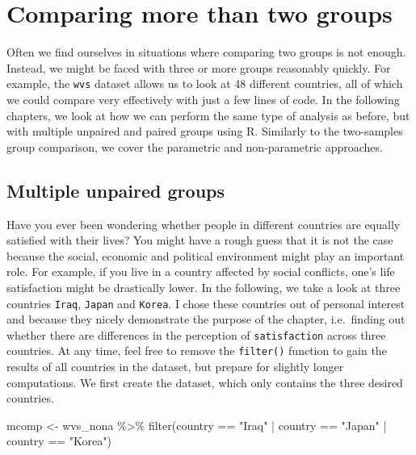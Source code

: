 \documentclass[
]{book}
\newenvironment{Shaded}{\begin{snugshade}}{\end{snugshade}}
\newcommand{\FunctionTok}[1]{\textcolor[rgb]{0.00,0.00,0.00}{#1}}
\newcommand{\NormalTok}[1]{#1}
\newcommand{\OtherTok}[1]{\textcolor[rgb]{0.56,0.35,0.01}{#1}}
\newcommand{\SpecialCharTok}[1]{\textcolor[rgb]{0.00,0.00,0.00}{#1}}
\newcommand{\StringTok}[1]{\textcolor[rgb]{0.31,0.60,0.02}{#1}}
\begin{document}
\hypertarget{comparing-more-than-two-groups}{%
\section{Comparing more than two groups}\label{comparing-more-than-two-groups}}

Often we find ourselves in situations where comparing two groups is not enough. Instead, we might be faced with three or more groups reasonably quickly. For example, the \texttt{wvs} dataset allows us to look at 48 different countries, all of which we could compare very effectively with just a few lines of code. In the following chapters, we look at how we can perform the same type of analysis as before, but with multiple unpaired and paired groups using R. Similarly to the two-samples group comparison, we cover the parametric and non-parametric approaches.

\hypertarget{multiple-unpaired-groups}{%
\subsection{Multiple unpaired groups}\label{multiple-unpaired-groups}}

Have you ever been wondering whether people in different countries are equally satisfied with their lives? You might have a rough guess that it is not the case because the social, economic and political environment might play an important role. For example, if you live in a country affected by social conflicts, one's life satisfaction might be drastically lower. In the following, we take a look at three countries \texttt{Iraq}, \texttt{Japan} and \texttt{Korea}. I chose these countries out of personal interest and because they nicely demonstrate the purpose of the chapter, i.e.~finding out whether there are differences in the perception of \texttt{satisfaction} across three countries. At any time, feel free to remove the \texttt{filter()} function to gain the results of all countries in the dataset, but prepare for slightly longer computations. We first create the dataset, which only contains the three desired countries.

\begin{Shaded}
\begin{Highlighting}[]
\NormalTok{mcomp }\OtherTok{\textless{}{-}}\NormalTok{ wvs\_nona }\SpecialCharTok{\%\textgreater{}\%}
  \FunctionTok{filter}\NormalTok{(country }\SpecialCharTok{==} \StringTok{"Iraq"} \SpecialCharTok{|}
\NormalTok{           country }\SpecialCharTok{==} \StringTok{"Japan"} \SpecialCharTok{|}
\NormalTok{           country }\SpecialCharTok{==} \StringTok{"Korea"}\NormalTok{)}
\end{Highlighting}
\end{Shaded}
\end{document}
